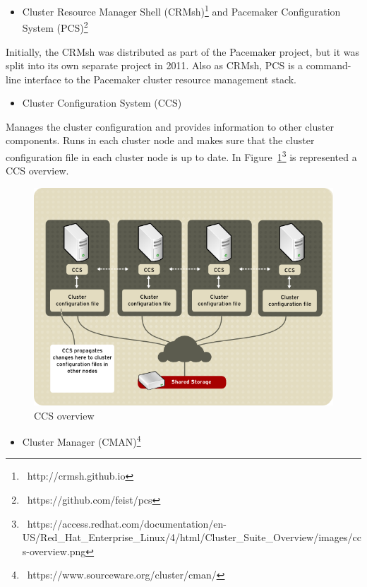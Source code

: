 \documentclass[a4paper, 12pt]{book}
\begin{document}
\begin{itemize}[leftmargin=*]
	\item Cluster Resource Manager Shell (CRMsh)\footnote{{\tiny\ http://crmsh.github.io}} and Pacemaker Configuration System (PCS)\footnote{{\tiny\ https://github.com/feist/pcs}}
\end{itemize}

\noindent Initially, the CRMsh was distributed as part of the Pacemaker project, but it was split into its own separate project in 2011. Also as CRMsh, PCS is a command-line interface to the Pacemaker cluster resource management stack.

\begin{itemize}[leftmargin=*]
	\item Cluster Configuration System (CCS)
\end{itemize}

\noindent Manages the cluster configuration and provides information to other cluster components. Runs in each cluster node and makes sure that the cluster configuration file in each cluster node is up to date. In Figure~\ref{fig:ccs}\footnote{\tiny\ {https://access.redhat.com/documentation/en-US/Red\_Hat\_Enterprise\_Linux/4/html/Cluster\_Suite\_Overview/images/ccs-overview.png}} is represented a CCS overview.

\begin{figure}[H]
  \centering
  \includegraphics[scale=0.55]{ccs-overview.png}
  \caption[CCS overview]{CCS overview}
  \label{fig:ccs}
\end{figure}

\begin{itemize}[leftmargin=*]
	\item Cluster Manager (CMAN)\footnote{{\tiny\ https://www.sourceware.org/cluster/cman/}}
\end{itemize}
\end{document}
